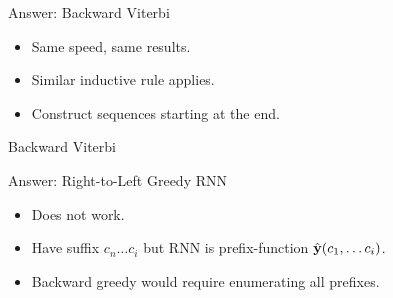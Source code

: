 \documentclass{beamer}
\def\Lattice{
    \matrix (network)
    [matrix of nodes,
    nodes in empty cells,
    ampersand replacement=\&,
    column sep={1cm},
    row sep={0.1cm},
    nodes={outer sep=0pt,circle,minimum size=0.5cm, minimum width=1.3cm,draw, rectangle} ]
    {
     O \& O \& O \& O \& O\\
     I-PER \& I-PER \& I-PER \& I-PER \& I-PER \\ 
     I-ORG \& I-ORG \& I-ORG \& I-ORG \& I-ORG \\ 
     I-LOC \& I-LOC \& I-LOC \& I-LOC \& I-LOC \\ 
     |[draw=none]| \\
     |[draw=none]| Mayor \& |[draw=none]| DeBlasio \& |[draw=none]| from \& |[draw=none]| New  \& |[draw=none]| York  \\  
};
}
\begin{document}
\begin{frame}{Answer: Backward Viterbi}
  \begin{itemize}
  \item Same speed, same results.
  \item Similar inductive rule applies.
  \item Construct sequences starting at the end. 
  \end{itemize}

  \begin{algorithmic}
    \EndFor{}
    \EndFor{}
    \EndProcedure{}
  \end{algorithmic}
\end{frame}

\begin{frame}{Backward Viterbi}
  \begin{center}
   
  \end{center}  
\end{frame}


\begin{frame}{Answer: Right-to-Left Greedy RNN }
  \begin{itemize}
  \item Does not work. 
    \air
  \item Have suffix $c_n \ldots c_i$ but RNN is prefix-function  $\hat{\mathbf{y}}(c_1, \ldots c_i)$.
    \air 
  \item Backward greedy would require enumerating all prefixes. 
  \end{itemize}
\end{frame}
\end{document}
